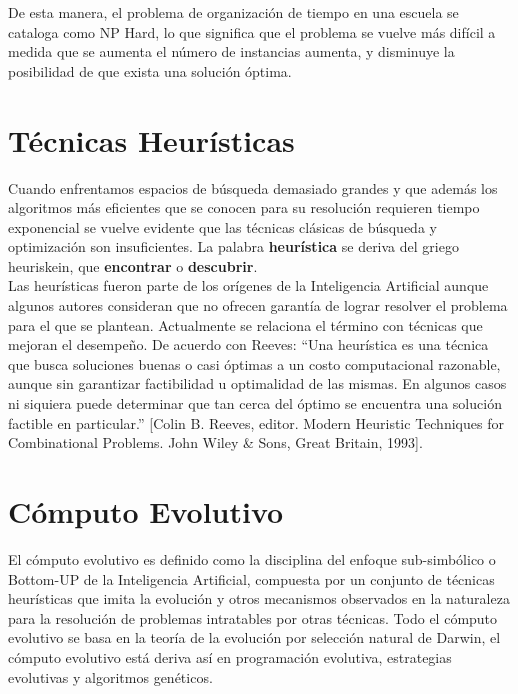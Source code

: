 	De esta manera, el problema de organización de tiempo en una escuela se cataloga como NP Hard, lo que significa que el problema se vuelve más difícil a medida que se aumenta el número de instancias aumenta, y disminuye la posibilidad de que exista una solución óptima.\\

	\section{Técnicas Heurísticas}
	
		Cuando enfrentamos espacios de búsqueda demasiado grandes y que además los algoritmos más eficientes que se conocen para su resolución requieren tiempo exponencial se vuelve evidente que las técnicas clásicas de búsqueda y optimización son insuficientes. La palabra \textbf{heurística} se deriva del griego heuriskein, que \textbf{encontrar} o \textbf{descubrir}. \\
		
		Las heurísticas fueron parte de los orígenes de la Inteligencia Artificial aunque algunos autores consideran que no ofrecen garantía de lograr resolver el problema para el que se plantean. Actualmente se relaciona el término con técnicas que mejoran el desempeño. De acuerdo con Reeves: “Una heurística es una técnica que busca soluciones buenas o casi óptimas a un costo computacional razonable, aunque sin garantizar factibilidad u optimalidad de las mismas. En algunos casos ni siquiera puede determinar que tan cerca del óptimo se encuentra una solución factible en particular.” [Colin B. Reeves, editor. Modern Heuristic Techniques for Combinational Problems. John Wiley \& Sons, Great Britain, 1993].\\

	\section{Cómputo Evolutivo}
		
		El cómputo evolutivo es definido como la disciplina del enfoque sub-simbólico o Bottom-UP de la Inteligencia Artificial, compuesta por un conjunto de técnicas heurísticas que imita la evolución y otros mecanismos observados en la naturaleza para la resolución de problemas intratables por otras técnicas. Todo el cómputo evolutivo se basa en la teoría de la evolución por selección natural de Darwin, el cómputo evolutivo está deriva así en programación evolutiva, estrategias evolutivas y algoritmos genéticos.\\

